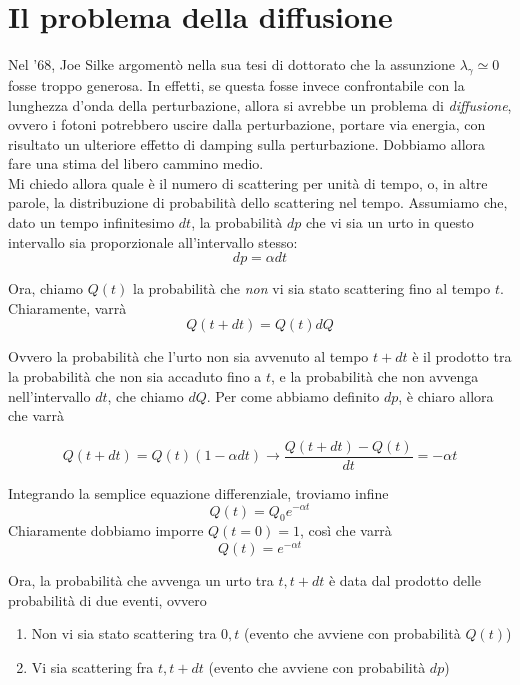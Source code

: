 \documentclass{report}
\begin{document}
\section{Il problema della diffusione}

Nel '68, Joe Silke argomentò nella sua tesi di dottorato che la assunzione $\lambda_\gamma \simeq 0 $ fosse troppo generosa. In effetti, se questa fosse invece confrontabile con la lunghezza d'onda della perturbazione, allora si avrebbe un problema di \emph{diffusione}, ovvero i fotoni potrebbero uscire dalla perturbazione, portare via energia, con risultato un ulteriore effetto di damping sulla perturbazione. Dobbiamo allora fare una stima del libero cammino medio. \\

Mi chiedo allora quale è il numero di scattering per unità di tempo, o, in altre parole, la distribuzione di probabilità dello scattering nel tempo. Assumiamo che, dato un tempo infinitesimo $dt$, la probabilità $dp$ che vi sia un urto in questo intervallo sia proporzionale all'intervallo stesso: 
\begin{equation}
    dp = \alpha dt
\end{equation}

Ora, chiamo $Q(t)$ la probabilità che \emph{non} vi sia stato scattering fino al tempo $t$. Chiaramente, varrà 
\begin{equation}
    Q(t+dt) = Q(t)dQ
\end{equation}

Ovvero la probabilità che l'urto non sia avvenuto al tempo $t+dt$ è il prodotto tra la probabilità che non sia accaduto fino a $t$, e la probabilità che non avvenga nell'intervallo $dt$, che chiamo $dQ$. Per come abbiamo definito $dp$, è chiaro allora che varrà 

\begin{equation}
    Q(t+dt) = Q(t)(1-\alpha dt) \rightarrow \frac{Q(t+dt)- Q(t)}{dt} = -\alpha t
\end{equation}

Integrando la semplice equazione differenziale, troviamo infine 
\begin{equation}
    Q(t) = Q_0e^{-\alpha t}
\end{equation}
Chiaramente dobbiamo imporre $Q(t=0) = 1$, così che varrà 
\begin{equation}
    Q(t) = e^{-\alpha t}
\end{equation}

Ora, la probabilità che avvenga un urto tra $t, t+dt$ è data dal prodotto delle probabilità di due eventi, ovvero 
\begin{enumerate}
    \item Non vi sia stato scattering tra $0, t$ (evento che avviene con probabilità $Q(t)$) 
    \item Vi sia scattering fra $t, t+dt$ (evento che avviene con probabilità $dp$)
\end{enumerate}
\end{document}
